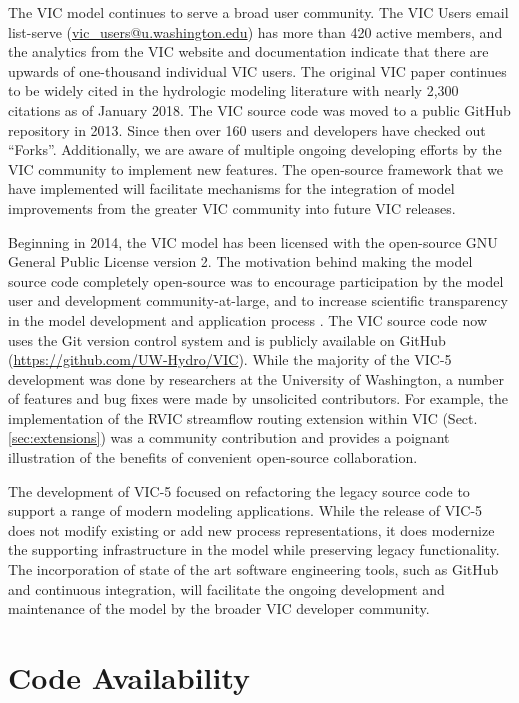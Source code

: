 \documentclass[gmd, manuscript]{copernicus}
\begin{document}
\conclusions[Conclusions]
\label{sec:conclusions}

  The VIC model continues to serve a broad user community. The VIC Users email list-serve (\url{vic_users@u.washington.edu}) has more than 420 active members, and the analytics from the VIC website and documentation indicate that there are upwards of one-thousand individual VIC users. The original VIC paper \citep{Liang_1994} continues to be widely cited in the hydrologic modeling literature with nearly 2,300 citations as of January 2018. The VIC source code was moved to a public GitHub repository in 2013. Since then over 160 users and developers have checked out ``Forks''. Additionally, we are aware of multiple ongoing developing efforts by the VIC community to implement new features. The open-source framework that we have implemented will facilitate mechanisms for the integration of model improvements from the greater VIC community into future VIC releases.

  Beginning in 2014, the VIC model has been licensed with the open-source GNU General Public License version 2. The motivation behind making the model source code completely open-source was to encourage participation by the model user and development community-at-large, and to increase scientific transparency in the model development and application process \citep{Ince_2012}. The VIC source code now uses the Git version control system \citep{Torvalds_2010} and is publicly available on GitHub (\url{https://github.com/UW-Hydro/VIC}). While the majority of the VIC-5 development was done by researchers at the University of Washington, a number of features and bug fixes were made by unsolicited contributors. For example, the implementation of the RVIC streamflow routing extension within VIC (Sect. \ref{sec:extensions}) was a community contribution and provides a poignant illustration of the benefits of convenient open-source collaboration.

  The development of VIC-5 focused on refactoring the legacy source code to support a range of modern modeling applications. While the release of VIC-5 does not modify existing or add new process representations, it does modernize the supporting infrastructure in the model while preserving legacy functionality. The incorporation of state of the art software engineering tools, such as GitHub and continuous integration, will facilitate the ongoing development and maintenance of the model by the broader VIC developer community.

\section{Code Availability}
\label{appendix:code_avail}
\end{document}
